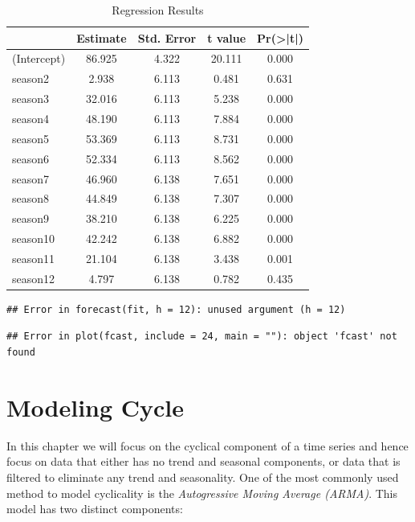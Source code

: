 \documentclass[]{book}
\theoremstyle{definition}
\theoremstyle{definition}
\theoremstyle{definition}
\theoremstyle{remark}
\begin{document}
\begin{table}[t]

\caption{\label{tab:ch5-table3}Regression Results}
\centering
\begin{tabular}{lcccc}
\toprule
  & Estimate & Std. Error & t value & Pr(>|t|)\\
\midrule
(Intercept) & 86.925 & 4.322 & 20.111 & 0.000\\
season2 & 2.938 & 6.113 & 0.481 & 0.631\\
season3 & 32.016 & 6.113 & 5.238 & 0.000\\
season4 & 48.190 & 6.113 & 7.884 & 0.000\\
season5 & 53.369 & 6.113 & 8.731 & 0.000\\
\addlinespace
season6 & 52.334 & 6.113 & 8.562 & 0.000\\
season7 & 46.960 & 6.138 & 7.651 & 0.000\\
season8 & 44.849 & 6.138 & 7.307 & 0.000\\
season9 & 38.210 & 6.138 & 6.225 & 0.000\\
season10 & 42.242 & 6.138 & 6.882 & 0.000\\
\addlinespace
season11 & 21.104 & 6.138 & 3.438 & 0.001\\
season12 & 4.797 & 6.138 & 0.782 & 0.435\\
\bottomrule
\end{tabular}
\end{table}

\begin{verbatim}
## Error in forecast(fit, h = 12): unused argument (h = 12)
\end{verbatim}

\begin{verbatim}
## Error in plot(fcast, include = 24, main = ""): object 'fcast' not found
\end{verbatim}

\hypertarget{modeling-cycle}{%
\chapter{Modeling Cycle}\label{modeling-cycle}}

In this chapter we will focus on the cyclical component of a time series and hence focus on data that either has no trend and seasonal components, or data that is filtered to eliminate any trend and seasonality. One of the most commonly used method to model cyclicality is the \emph{Autogressive Moving Average (ARMA)}. This model has two distinct components:
\end{document}
